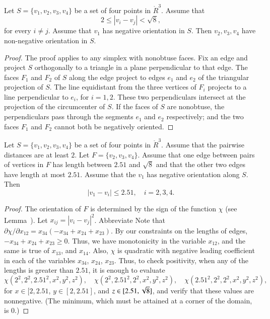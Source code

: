 \newpage

\begin{lemma} 
Let $S=\{v_1,v_2,v_3,v_4\}$ be a set of four points in $\ring{R}^3$.
Assume that 
   $$
   2\le |v_i-v_j| < \sqrt8,
   $$
for every $i\ne j$.
Assume that $v_1$ has negative orientation in $S$.  Then
$v_2,v_3,v_4$ have non-negative orientation in $S$.
\end{lemma}


\begin{proof}
The proof applies to any simplex with nonobtuse faces. 
Fix an edge and project $S$ orthogonally
to a triangle in a plane perpendicular to that edge. The faces
$F_1$ and $F_2$ of $S$ along the edge project to edges $e_1$ and
$e_2$ of the triangular projection of $S$. The line equidistant
from the three vertices of $F_i$ projects to a line perpendicular
to $e_i$, for $i=1,2$. These two perpendiculars intersect at the
projection of the circumcenter of $S$.  If the faces of $S$ are
nonobtuse, the perpendiculars pass through the segments $e_1$ and
$e_2$ respectively; and the two faces $F_1$ and $F_2$ cannot both
be negatively oriented.
\end{proof}


\newpage
\begin{lemma}
Let $S=\{v_1,v_2,v_3,v_4\}$ be a set of four points in $\ring{R}^3$.
Assume that the pairwise distances are at least $2$.
Let $F=\{v_2,v_3,v_4\}$.
Assume that one edge between
pairs of vertices in $F$
has length between $2.51$ and $\sqrt8$ and that
the other two edges have length at most $2.51$.  
Assume that the $v_1$ has negative orientation
along $S$. Then
   $$
   |v_1-v_i|\le 2.51, \quad i=2,3,4.
   $$
\end{lemma}

\begin{proof}  
The orientation of $F$ is determined by the sign of the function
$\chi$ (see Lemma~). 
Let $x_{ij}=|v_i-v_j|^2$.  Abbreviate
Note that $\partial\chi/\partial x_{12} = x_{34}
(-x_{34}+x_{24}+x_{23})$.  By our
constraints on the lengths of edges, 
$-x_{34}+x_{24}+x_{23}\ge0$. Thus, we have monotonicity in the variable $x_{12}$,
and the same is true of $x_{13}$, and $x_{14}$. Also, $\chi$ is
quadratic with negative leading coefficient in each of the
variables $x_{34}$, $x_{24}$, $x_{23}$. Thus, to check positivity, when any
of the lengths is greater than $2.51$, it is enough to evaluate
$$\chi(2^2,2^2,2.51^2,x^2,y^2,z^2), \quad
\chi(2^2,2.51^2,2^2,x^2,y^2,z^2),  \quad
\chi(2.51^2,2^2,2^2,x^2,y^2,z^2),$$ for $x\in[2,2.51$,
$y\in[2,2.51]$, and $z\in[2.51,\sqrt8]$, and verify that these
values are nonnegative. (The minimum, which must be attained at a
corner of the domain, is  $0$.)
\end{proof}

